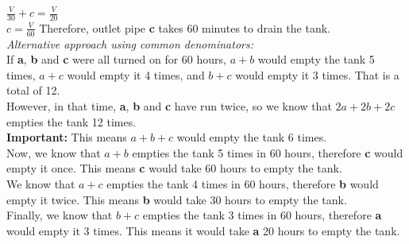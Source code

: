 \documentclass[../main.tex]{subfiles}
\begin{document}
\begin{enumerate}
    \(\frac{V}{30}+c=\frac{V}{20}\)\\
    \(c=\frac{V}{60}\) Therefore, outlet pipe \textbf{c} takes 60 minutes to drain the tank.\\
    
    \textit{Alternative approach using common denominators:}\\
    If \textbf{a}, \textbf{b} and \textbf{c} were all turned on for 60 hours, \(a+b\) would empty the tank 5 times, \(a+c\) would empty it 4 times, and \(b+c\) would empty it 3 times. That is a total of 12.\\ However, in that time, \textbf{a}, \textbf{b} and \textbf{c} have run twice, so we know that \(2a+2b+2c\) empties the tank 12 times.\\
    \textbf{Important:} This means \(a+b+c\) would empty the tank 6 times.\\

    Now, we know that \(a+b\) empties the tank 5 times in 60 hours, therefore \textbf{c} would empty it once. This means \textbf{c} would take 60 hours to empty the tank.\\
    
    We know that \(a+c\) empties the tank 4 times in 60 hours, therefore \textbf{b} would empty it twice. This means \textbf{b} would take 30 hours to empty the tank.\\
    
    Finally, we know that \(b+c\) empties the tank 3 times in 60 hours, therefore \textbf{a} would empty it 3 times. This means it would take \textbf{a} 20 hours to empty the tank.

\end{enumerate}
\end{document}
